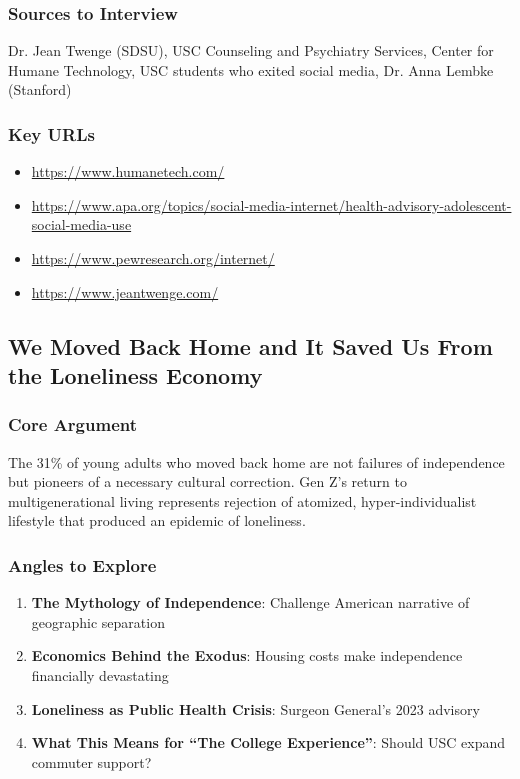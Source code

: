 \documentclass[11pt,letterpaper]{article}
\begin{document}
\subsubsection*{Sources to Interview}
Dr. Jean Twenge (SDSU), USC Counseling and Psychiatry Services, Center for Humane Technology, USC students who exited social media, Dr. Anna Lembke (Stanford)

\subsubsection*{Key URLs}
\begin{itemize}[noitemsep]
    \item \url{https://www.humanetech.com/}
    \item \url{https://www.apa.org/topics/social-media-internet/health-advisory-adolescent-social-media-use}
    \item \url{https://www.pewresearch.org/internet/}
    \item \url{https://www.jeantwenge.com/}
\end{itemize}

\newpage
\subsection{We Moved Back Home and It Saved Us From the Loneliness Economy}

\subsubsection*{Core Argument}
The 31\% of young adults who moved back home are not failures of independence but pioneers of a necessary cultural correction. Gen Z's return to multigenerational living represents rejection of atomized, hyper-individualist lifestyle that produced an epidemic of loneliness.

\subsubsection*{Angles to Explore}
\begin{enumerate}[noitemsep]
    \item \textbf{The Mythology of Independence}: Challenge American narrative of geographic separation
    \item \textbf{Economics Behind the Exodus}: Housing costs make independence financially devastating
    \item \textbf{Loneliness as Public Health Crisis}: Surgeon General's 2023 advisory
    \item \textbf{What This Means for ``The College Experience''}: Should USC expand commuter support?
\end{enumerate}
\end{document}
